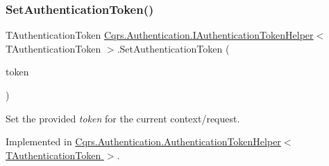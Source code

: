 \mbox{\label{interfaceCqrs_1_1Authentication_1_1IAuthenticationTokenHelper_a1af9409257b2d8086be6dfae4edf37fb_a1af9409257b2d8086be6dfae4edf37fb}} 
\subsubsection{\texorpdfstring{Set\+Authentication\+Token()}{SetAuthenticationToken()}}
{\footnotesize\ttfamily T\+Authentication\+Token \hyperlink{interfaceCqrs_1_1Authentication_1_1IAuthenticationTokenHelper}{Cqrs.\+Authentication.\+I\+Authentication\+Token\+Helper}$<$ T\+Authentication\+Token $>$.Set\+Authentication\+Token (\begin{DoxyParamCaption}\item[{T\+Authentication\+Token}]{token }\end{DoxyParamCaption})}



Set the provided {\itshape token}  for the current context/request. 



Implemented in \hyperlink{classCqrs_1_1Authentication_1_1AuthenticationTokenHelper_a276361d51d5b8d4d880884b6bb1a1070_a276361d51d5b8d4d880884b6bb1a1070}{Cqrs.\+Authentication.\+Authentication\+Token\+Helper$<$ T\+Authentication\+Token $>$}.

